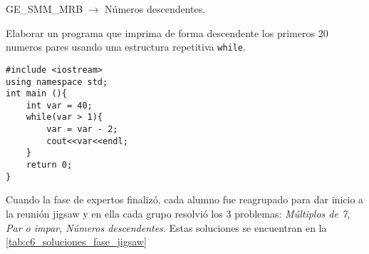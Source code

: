\begin{center}
	GE\_SMM\_MRB $\longrightarrow$ Números descendentes.
\end{center}

Elaborar un programa que imprima de forma descendente los primeros 20 numeros pares usando una estructura repetitiva \texttt{while}.

\lstset{language=C, breaklines=true, basicstyle=\footnotesize}
\begin{lstlisting}
#include <iostream>
using namespace std;
int main (){
	int var = 40;
	while(var > 1){
		var = var - 2;
		cout<<var<<endl;
	}
	return 0;
}
\end{lstlisting}
\vspace{0.5cm}

Cuando la fase de expertos finalizó, cada alumno fue reagrupado para dar inicio a la reunión jigsaw y en ella cada grupo resolvió los 3 problemas: \emph{Múltiplos de 7, Par o impar, Números descendentes}. Estas soluciones se encuentran en la \autoref{tab:c6_soluciones_fase_jigsaw}
\clearpage
